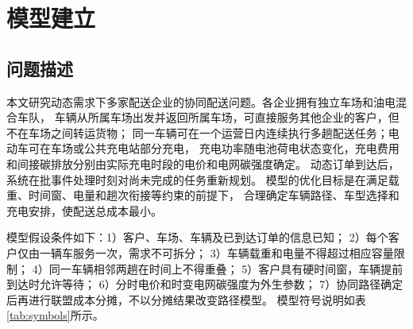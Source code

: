 \section{模型建立}

\subsection{问题描述}

本文研究动态需求下多家配送企业的协同配送问题。各企业拥有独立车场和油电混合车队，
车辆从所属车场出发并返回所属车场，可直接服务其他企业的客户，但不在车场之间转运货物；
同一车辆可在一个运营日内连续执行多趟配送任务；电动车可在车场或公共充电站部分充电，
充电功率随电池荷电状态变化，充电费用和间接碳排放分别由实际充电时段的电价和电网碳强度确定。
动态订单到达后，系统在批事件处理时刻对尚未完成的任务重新规划。
模型的优化目标是在满足载重、时间窗、电量和趟次衔接等约束的前提下，
合理确定车辆路径、车型选择和充电安排，使配送总成本最小。

模型假设条件如下：1）客户、车场、车辆及已到达订单的信息已知；
2）每个客户仅由一辆车服务一次，需求不可拆分；
3）车辆载重和电量不得超过相应容量限制；
4）同一车辆相邻两趟在时间上不得重叠；
5）客户具有硬时间窗，车辆提前到达时允许等待；
6）分时电价和时变电网碳强度为外生参数；
7）协同路径确定后再进行联盟成本分摊，不以分摊结果改变路径模型。
模型符号说明如表\ref{tab:symbols}所示。

